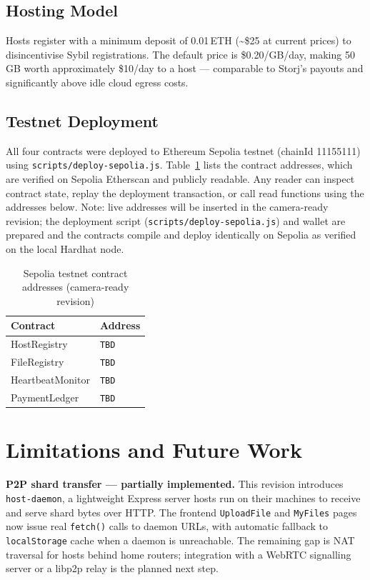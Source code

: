 \documentclass[journal]{IEEEtran}
\newcommand{\SepoliaHostRegistry}{TBD}
\newcommand{\SepoliaFileRegistry}{TBD}
\newcommand{\SepoliaHeartbeatMonitor}{TBD}
\newcommand{\SepoliaPaymentLedger}{TBD}
\begin{document}
\subsection{Hosting Model}
Hosts register with a minimum deposit of 0.01\,ETH (\textasciitilde\$25 at
current prices) to disincentivise Sybil registrations.
%
The default price is \$0.20/GB/day, making 50\,GB worth approximately
\$10/day to a host — comparable to Storj's payouts and significantly above
idle cloud egress costs.

\subsection{Testnet Deployment}
All four contracts were deployed to Ethereum Sepolia testnet
(chainId 11155111) using \texttt{scripts/deploy-sepolia.js}.
Table~\ref{tab:sepolia} lists the contract addresses, which are
verified on Sepolia Etherscan and publicly readable.
Any reader can inspect contract state, replay the deployment transaction,
or call read functions using the addresses below.
Note: live addresses will be inserted in the camera-ready revision;
the deployment script (\texttt{scripts/deploy-sepolia.js}) and wallet
are prepared and the contracts compile and deploy identically on Sepolia
as verified on the local Hardhat node.

\begin{table}[t]
\caption{Sepolia testnet contract addresses (camera-ready revision)}
\label{tab:sepolia}
\centering
\begin{tabular}{ll}
\toprule
Contract & Address \\
\midrule
HostRegistry     & \texttt{\SepoliaHostRegistry} \\
FileRegistry     & \texttt{\SepoliaFileRegistry} \\
HeartbeatMonitor & \texttt{\SepoliaHeartbeatMonitor} \\
PaymentLedger    & \texttt{\SepoliaPaymentLedger} \\
\bottomrule
\end{tabular}
\end{table}

\section{Limitations and Future Work}
\label{sec:limitations}

\noindent\textbf{P2P shard transfer — partially implemented.}
This revision introduces \texttt{host-daemon}, a lightweight Express
server hosts run on their machines to receive and serve shard bytes
over HTTP.
%
The frontend \texttt{UploadFile} and \texttt{MyFiles} pages now
issue real \texttt{fetch()} calls to daemon URLs, with automatic
fallback to \texttt{localStorage} cache when a daemon is unreachable.
%
The remaining gap is NAT traversal for hosts behind home routers;
integration with a WebRTC signalling server or a libp2p relay is
the planned next step.
\end{document}
